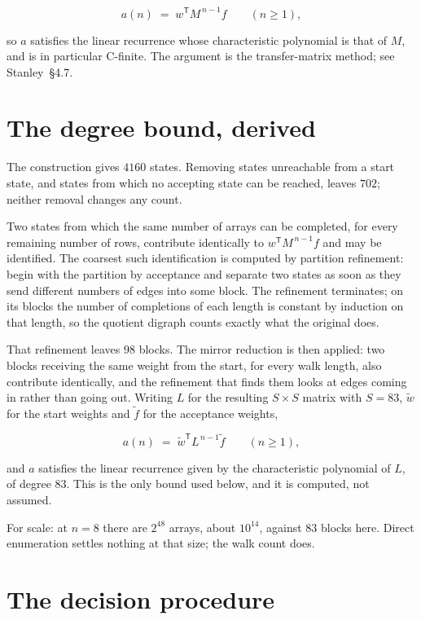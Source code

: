 \documentclass[11pt]{article}
\theoremstyle{definition}
\begin{document}
\[a(n) \;=\; w^{\mathsf T} M^{\,n-1} f \qquad (n \ge 1),\]

so $a$ satisfies the linear recurrence whose characteristic polynomial is that of $M$, and is in particular C-finite. The argument is the transfer-matrix method; see Stanley~\S4.7.

\section{The degree bound, derived}

The construction gives $4160$ states. Removing states unreachable from a start state, and states from which no accepting state can be reached, leaves $702$; neither removal changes any count.

Two states from which the same number of arrays can be completed, for every remaining number of rows, contribute identically to $w^{\mathsf T}M^{\,n-1}f$ and may be identified. The coarsest such identification is computed by partition refinement: begin with the partition by acceptance and separate two states as soon as they send different numbers of edges into some block. The refinement terminates; on its blocks the number of completions of each length is constant by induction on that length, so the quotient digraph counts exactly what the original does.

That refinement leaves $98$ blocks. The mirror reduction is then applied: two blocks receiving the same weight from the start, for every walk length, also contribute identically, and the refinement that finds them looks at edges coming in rather than going out. Writing $L$ for the resulting $S \times S$ matrix with $S = 83$, $\tilde w$ for the start weights and $\tilde f$ for the acceptance weights,

\[a(n) \;=\; \tilde w^{\mathsf T} L^{\,n-1} \tilde f \qquad (n \ge 1),\]

and $a$ satisfies the linear recurrence given by the characteristic polynomial of $L$, of degree $83$. This is the only bound used below, and it is computed, not assumed.

For scale: at $n = 8$ there are $2^{48}$ arrays, about $10^{14}$, against $83$ blocks here. Direct enumeration settles nothing at that size; the walk count does.

\section{The decision procedure}
\end{document}
